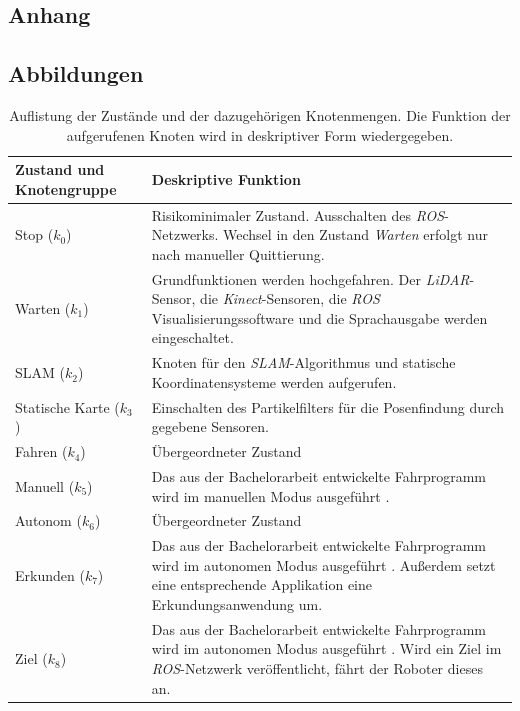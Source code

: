 \documentclass[12pt,a4paper,oneside,numbers=noenddot,headsepline,captions=tableheading,toc=bibliography,openany,tikz,margin=5mm]{scrbook}
\begin{document}
	\begin{appendix}
			\chapter{Anhang} 
						
			
			\section{Abbildungen} 
			\label{Abbildungen}
			
					
					
					\begin{table}[H]
						\caption{Auflistung der Zustände und der dazugehörigen Knotenmengen. Die Funktion der aufgerufenen Knoten wird in deskriptiver Form wiedergegeben.}
						\begin{center}
							
							\begin{tabular}{|m{}<{\centering}|m{}<{\centering}|}
								\hline
								
								Zustand und Knotengruppe & Deskriptive Funktion  \\ \hline \hline
								Stop ($k_0$)					&Risikominimaler Zustand. Ausschalten des \textit{ROS}-Netzwerks. Wechsel in den Zustand \textit{Warten} erfolgt nur nach manueller Quittierung. 				 \\ \cline{0-1}
								Warten ($k_1$)					&Grundfunktionen werden hochgefahren. Der \textit{LiDAR}-Sensor, die \textit{Kinect}-Sensoren, die \textit{ROS} Visualisierungssoftware und die Sprachausgabe werden eingeschaltet.				 \\ \cline{0-1}
								SLAM ($k_2$)					&Knoten für den \textit{SLAM}-Algorithmus und statische Koordinatensysteme werden aufgerufen.  				 \\ \cline{0-1}
								Statische Karte ($k_3$)			&Einschalten des Partikelfilters für die Posenfindung durch gegebene Sensoren. 				 \\ \cline{0-1} 
								Fahren ($k_4$)					&Übergeordneter Zustand				 \\ \cline{0-1}
								Manuell ($k_5$)					&Das aus der Bachelorarbeit entwickelte Fahrprogramm wird im manuellen Modus ausgeführt \cite{Bachelorarbeit}. 				 \\ \cline{0-1}
								Autonom ($k_6$)					&Übergeordneter Zustand	 				 \\ \cline{0-1}
								Erkunden ($k_7$)				&Das aus der Bachelorarbeit entwickelte Fahrprogramm wird im autonomen Modus ausgeführt \cite{Bachelorarbeit}. Außerdem setzt eine entsprechende Applikation eine Erkundungsanwendung um. 	 				 \\ \cline{0-1}
								Ziel ($k_8$)					&Das aus der Bachelorarbeit entwickelte Fahrprogramm wird im autonomen Modus ausgeführt \cite{Bachelorarbeit}. Wird ein Ziel im \textit{ROS}-Netzwerk veröffentlicht, fährt der Roboter dieses an.					 \\
								

\end{tabular}
\end{center}
\end{table}
\end{appendix}
\end{document}
